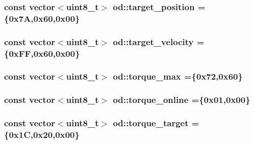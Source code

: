 \subsubsection[{\texorpdfstring{target\+\_\+position}{target_position}}]{\setlength{\rightskip}{0pt plus 5cm}const vector$<$uint8\+\_\+t$>$ od\+::target\+\_\+position =\{0x7\+A,0x60,0x00\}}\hypertarget{namespaceod_a0bdcdb539c588cfae0d43cc0ba40ea05}{}\label{namespaceod_a0bdcdb539c588cfae0d43cc0ba40ea05}
\subsubsection[{\texorpdfstring{target\+\_\+velocity}{target_velocity}}]{\setlength{\rightskip}{0pt plus 5cm}const vector$<$uint8\+\_\+t$>$ od\+::target\+\_\+velocity =\{0x\+F\+F,0x60,0x00\}}\hypertarget{namespaceod_a758ce0003cc482e5464959ed79c808e2}{}\label{namespaceod_a758ce0003cc482e5464959ed79c808e2}
\subsubsection[{\texorpdfstring{torque\+\_\+max}{torque_max}}]{\setlength{\rightskip}{0pt plus 5cm}const vector$<$uint8\+\_\+t$>$ od\+::torque\+\_\+max =\{0x72,0x60\}}\hypertarget{namespaceod_afe81091f209f3c5eaf8f720e730900fa}{}\label{namespaceod_afe81091f209f3c5eaf8f720e730900fa}
\subsubsection[{\texorpdfstring{torque\+\_\+online}{torque_online}}]{\setlength{\rightskip}{0pt plus 5cm}const vector$<$uint8\+\_\+t$>$ od\+::torque\+\_\+online =\{0x01,0x00\}}\hypertarget{namespaceod_ada58f32a60ef9137c7e9c4f4f54ace10}{}\label{namespaceod_ada58f32a60ef9137c7e9c4f4f54ace10}
\subsubsection[{\texorpdfstring{torque\+\_\+target}{torque_target}}]{\setlength{\rightskip}{0pt plus 5cm}const vector$<$uint8\+\_\+t$>$ od\+::torque\+\_\+target =\{0x1\+C,0x20,0x00\}}\hypertarget{namespaceod_a3059829b7387e81bd7bad08c15364497}{}\label{namespaceod_a3059829b7387e81bd7bad08c15364497}
